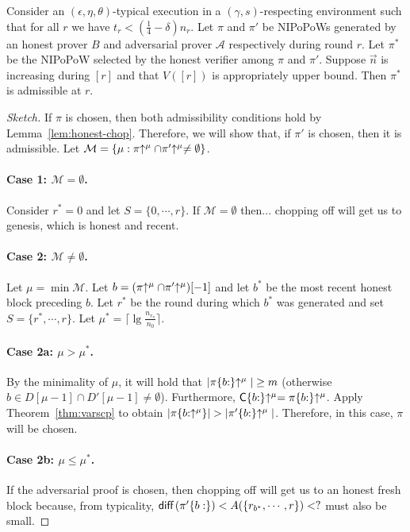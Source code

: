 \begin{theorem}\label{thm:admissibility}
  Consider an $(\epsilon, \eta, \theta)$-typical execution in a
  $(\gamma, s)$-respecting environment such that for all $r$ we have
  $t_r < (\frac{1}{4} - \delta)n_r$.
  Let $\pi$ and $\pi'$ be NIPoPoWs generated by an honest prover $B$
  and adversarial prover $\mathcal{A}$ respectively during round $r$. Let
  $\pi^*$ be the NIPoPoW selected by the honest verifier among $\pi$
  and $\pi'$. Suppose $\vec{n}$ is increasing during $[r]$ and
  that $V([r])$ is appropriately upper bound.
  Then $\pi^*$ is admissible at $r$.
\end{theorem}
\begin{proof}[Sketch]
  If $\pi$ is chosen, then both admissibility conditions hold by
  Lemma~\ref{lem:honest-chop}.
  Therefore, we will show that, if $\pi'$ is chosen, then it is admissible.
  Let $\mathcal{M} =
  \{\mu: \pi\negthickspace\uparrow^\mu \cap \pi'\negthickspace\uparrow^\mu \neq \emptyset\}$.
  \paragraph{Case 1: $\mathcal{M} = \emptyset$.}
  Consider $r^* = 0$ and let $S = \{0, \cdots, r\}$.
  If $\mathcal{M} = \emptyset$ then... chopping off will get us to genesis,
  which is honest and recent. 
  \paragraph{Case 2: $\mathcal{M} \neq \emptyset$.}
  Let
  $\mu = \min\mathcal{M}$. Let
  $b = (\pi\negthickspace\uparrow^\mu \cap \pi'\negthickspace\uparrow^\mu)[-1]$
  and let $b^*$ be the most recent honest block preceding $b$.
  Let $r^*$ be the round during which $b^*$ was generated
  and set $S = \{r^*, \cdots, r\}$.
  Let $\mu^* = \lceil\lg\frac{n_{r_\pi}}{n_0}\rceil$.
  \paragraph{Case 2a: $\mu > \mu^*$.}
  By the minimality of $\mu$, it will hold that
  $|\pi\{b{:}\}\negthickspace\uparrow^\mu| \geq m$ (otherwise
  $b \in D[\mu - 1] \cap D'[\mu - 1] \neq \emptyset$).
  Furthermore, $\mathsf{C}\{b{:}\}\negthickspace\uparrow^\mu = \pi\{b{:}\}\negthickspace\uparrow^\mu$.
  Apply Theorem~\ref{thm:varscp} to obtain
  $|\pi\{b{:}\negthickspace\uparrow^\mu\}| > |\pi'\{b{:}\}\negthickspace\uparrow^\mu|$.
  Therefore, in this case, $\pi$ will be chosen.
  \paragraph{Case 2b: $\mu \leq \mu^*$.}
  If the adversarial proof is chosen, then chopping off will get us to an
  honest fresh block because, from typicality,
  $\operatorname{\textsf{diff}\,}(\pi'\{b:\}) < A(\{r_{b^*}, \cdots, r\}) < ?$ must also be small. 
\end{proof}

